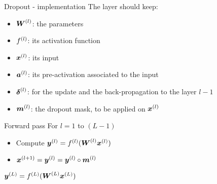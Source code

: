 

\begin{frame}{Dropout - implementation}
  The layer should keep: 
  \begin{itemize}
  \item $\boldsymbol{W}^{(l)}$: the parameters
  \item $f^{(l)}$: its activation function
  \item $\boldsymbol{x}^{(l)}$: its input
  \item $\boldsymbol{a}^{(l)}$: its pre-activation associated to the input
  \item $\boldsymbol{\delta}^{(l)}$: for the update and the back-propagation to the layer $l-1$
  \item {\color{red} $\boldsymbol{m}^{(l)}$: the dropout mask}, to be applied
    on $\boldsymbol{x}^{(l)}$ 
  \end{itemize}
  \begin{block}{Forward pass}
        For $l=1$ to $(L-1)$
    \begin{itemize}
    \item Compute $\boldsymbol{y}^{(l)}=f^{(l)}(\boldsymbol{W}^{(l)}\boldsymbol{x}^{(l)})$
    \item $\boldsymbol{x}^{(l+1)} =\boldsymbol{y}^{(l)} = \boldsymbol{y}^{(l)} \circ \boldsymbol{m}^{(l)}$
    \end{itemize}
    $\boldsymbol{y}^{(L)}=f^{(L)}(\boldsymbol{W}^{(L)}\boldsymbol{x}^{(L)})$
  \end{block}
\end{frame}